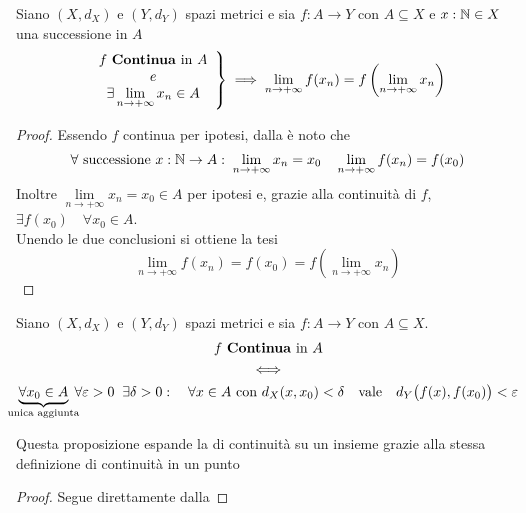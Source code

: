 \begin{corollary}
	Siano $(X,d_X)$ e $(Y,d_Y)$ spazi metrici e sia $f: A \to Y$ con $A \subseteq X$ e $x: \mathbb{N} \in X$ una successione in $A$
	\begin{equation*}
		\left.
		\begin{array}{c}
			f \text{ \textbf{Continua} in } A\\
			e\\
			\exists \lim\limits_{n \to +\infty} x_n \in A
		\end{array}
		\right\} \implies
		\lim\limits_{n \to +\infty} f(x_n) = f\left( \lim\limits_{n \to +\infty} x_n \right)
	\end{equation*}
	\begin{proof}
		Essendo $f$ continua per ipotesi, dalla  è noto che
		\[\forall \text{ successione } x:\mathbb{N} \to A:\; \lim\limits_{n \to +\infty} x_n = x_0 \quad \lim\limits_{n \to +\infty} f(x_n) = f(x_0)\]
		Inoltre $\lim\limits_{n \to +\infty} x_n = x_0 \in A$ per ipotesi e, grazie alla continuità di $f$, $\exists f(x_0) \quad \forall x_0 \in A$.\\
		Unendo le due conclusioni si ottiene la tesi
		\[\lim\limits_{n \to +\infty} f(x_n) = f(x_0) = f\left( \lim\limits_{n \to +\infty} x_n \right)\]
	\end{proof}
\end{corollary}

\begin{proposition}
	\label{prop:funz_cont_per_succ_in_ins}
	Siano $(X,d_X)$ e $(Y,d_Y)$ spazi metrici e sia $f: A \to Y$ con $A \subseteq X$.
	\begin{equation*}
		\begin{gathered}
			f \text{ \textbf{Continua} in } A\\
			\iff\\
			\underbrace{\forall x_0 \in A}_{\mathclap{\text{unica aggiunta}}} \; \forall \varepsilon > 0\;\;\exists \delta > 0:\quad \forall x \in A \text{ con } d_X(x,x_0)<\delta \quad \text{vale} \quad d_Y \bigl(f(x),f(x_0)\bigr) < \varepsilon
		\end{gathered}
	\end{equation*}
	\begin{note}
		Questa proposizione espande la  di continuità su un insieme grazie alla stessa definizione di continuità in un punto
	\end{note}
	\begin{proof}
		Segue direttamente dalla 
	\end{proof}
\end{proposition}

